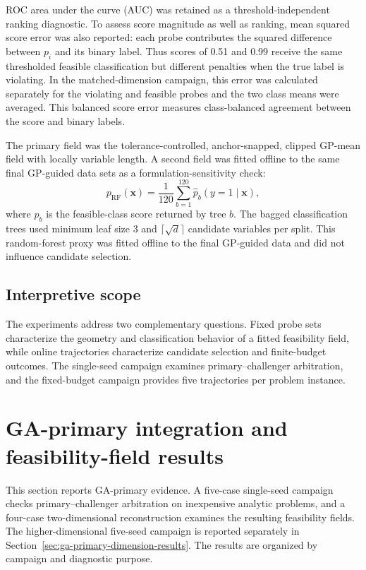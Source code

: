 \documentclass[twoside]{article}
\begin{document}
ROC area under the curve (AUC) was retained as a threshold-independent ranking
diagnostic. To assess score magnitude as well as ranking, mean squared score
error was also reported: each probe contributes the squared difference between
\(p_i\) and its binary label. Thus scores of 0.51 and 0.99 receive the same
thresholded feasible classification but different penalties when the true label
is violating. In the matched-dimension campaign, this error was calculated
separately for the violating and feasible probes and the two class means were
averaged. This balanced score error measures class-balanced agreement between
the score and binary labels.

The primary field was the tolerance-controlled, anchor-snapped, clipped GP-mean
field with locally variable length. A second field was fitted offline to the same final
GP-guided data sets as a formulation-sensitivity check:
\begin{equation}
  p_{\mathrm{RF}}(\mathbf{x})
  =
  \frac{1}{120}\sum_{b=1}^{120}
  \widehat p_b(y=1\mid\mathbf{x}),
  \label{eq:offline-rf-proxy}
\end{equation}
where \(\widehat p_b\) is the feasible-class score returned by tree \(b\).
The bagged classification trees used minimum leaf size 3 and
\(\lceil\sqrt d\rceil\) candidate variables per split. This random-forest
proxy was fitted offline to the final GP-guided data and did not influence
candidate selection.

\subsection{Interpretive scope}

The experiments address two complementary questions. Fixed probe sets
characterize the geometry and classification behavior of a fitted feasibility
field, while online trajectories characterize candidate selection and
finite-budget outcomes. The single-seed campaign examines
primary--challenger arbitration, and the fixed-budget campaign provides five
trajectories per problem instance.

\section{GA-primary integration and feasibility-field results}
\label{sec:release-results}

This section reports GA-primary evidence. A five-case
single-seed campaign checks primary--challenger arbitration on inexpensive
analytic problems, and a four-case two-dimensional reconstruction examines
the resulting feasibility fields.  The higher-dimensional five-seed campaign
is reported separately in Section~\ref{sec:ga-primary-dimension-results}.
The results are organized by campaign and diagnostic purpose.
\end{document}
